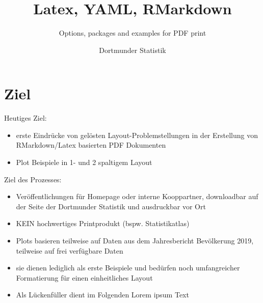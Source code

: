 \documentclass[
  a4paper,
  twoside]{article}
\title{Latex, YAML, RMarkdown}
\subtitle{Options, packages and examples for PDF print}
\author{Dortmunder Statistik}
\date{}
\providecommand{\tightlist}{%
  \setlength{\itemsep}{0pt}\setlength{\parskip}{0pt}}
\begin{document}
\maketitle

\renewcommand*\contentsname{Inhaltsverzeichnis}
{
\hypersetup{linkcolor=}
\setcounter{tocdepth}{4}
\tableofcontents
}
\newpage

\hypertarget{ziel}{%
\section{Ziel}\label{ziel}}

\textcolor{DoStat}{Heutiges Ziel:}

\begin{itemize}
\tightlist
\item
  erste Eindrücke von gelösten Layout-Problemstellungen in der Erstellung von RMarkdown/Latex basierten PDF Dokumenten
\item
  Plot Beispiele in 1- und 2 spaltigem Layout
\end{itemize}

\textcolor{DoStat}{Ziel des Prozesses:}

\begin{itemize}
\tightlist
\item
  Veröffentlichungen für Homepage oder interne Kooppartner, downloadbar auf der Seite der Dortmunder Statistik und ausdruckbar vor Ort
\item
  KEIN hochwertiges Printprodukt (bspw. Statistikatlas)
\item
  Plots basieren teilweise auf Daten aus dem Jahresbericht Bevölkerung 2019, teilweise auf frei verfügbare Daten
\item
  sie dienen lediglich als \textcolor{DoStat}{erste Beispiele} und bedürfen noch umfangreicher Formatierung für einen einheitliches Layout
\item
  Als Lückenfüller dient im Folgenden Lorem ipsum Text
\end{itemize}

\newpage
\end{document}
